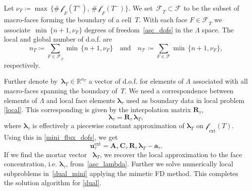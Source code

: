 \documentclass[12pt]{article}
\newcommand{\vect}[1]{\boldsymbol{\mathbf{#1}}}
\newcommand{\bcell}{T}
\newcommand{\bmesh}{{\vect{\mathcal T}}}
\newcommand{\mmesh}{{\vect{\mathcal \tau}}}
\newcommand{\bfaces}[1][]{{\vect{\mathcal F}_{\text{#1}}}}
\newcommand{\mfaces}[1][]{{\vect{\mathcal f}_{\text{#1}}}}
\newcommand{\Rn}[1]{{\mathbb R^{#1}}}
\begin{document}
	Let $\nu_F \coloneqq \max\,\{ \#\,\mfaces_F(T^+),\,\#\,\mfaces_F(T^-) \}$. We set~$\bfaces_\bcell \subset \bfaces$ to be the subset of macro-faces forming the boundary of a cell~$T$. With each face $F \in \bfaces_\bcell$ we associate~$\min\,\{ n+1, \nu_F \}$ degrees of freedom~\eqref{asc_dofs} in the $\Lambda$ space. The local and global number of d.o.f. are
	\[
		n_\bcell \coloneqq \sum_{F \in \bfaces_\bcell} \min\,\{ n+1, \nu_F \} \quad\text{and}\quad
		n_\bmesh \coloneqq \sum_{F \in \bfaces} \min\,\{ n+1, \nu_F \},
	\]
	respectively.
	
	Further denote by~${{\vect \lambda}_\bcell \in \Rn{n_\bcell}}$ a vector of d.o.f. for elements of $\Lambda$ associated with all macro-faces spanning the boundary of~$\bcell$. We need a correspondence between elements of $\Lambda$ and local face elements $\vect \lambda_\mmesh$ used as boundary data in local problem \eqref{local}.
	This corresponding is given by the interpolation matrix $ \vect R_\mmesh$,
	\begin{equation}\label{asc_lambda}
		{\vect \lambda}_\mmesh = \vect R_\mmesh\,{\vect \lambda}_\bcell,
	\end{equation}
	where ${\vect \lambda}_\mmesh$ is effectively a piecewise constant approximation of ${\vect \lambda}_\bcell$ on $\mfaces_{\text{ext}}(T)$.
	Using this in \eqref{mini_flux_dofs}, we get
	\begin{equation}\label{asc_flux_lambda}
		{\vect u}^\text{ext}_\mmesh = \vect A_\mmesh\,\vect C_\mmesh\,\vect R_\mmesh\,{\vect \lambda}_\bcell - {\vect a}_\mmesh.
	\end{equation}
	If we find the mortar vector ~${\vect \lambda}_\bcell$, we recover the local approximation to the face concentration, i.e. ${\vect \lambda}_\mmesh$, from~\eqref{asc_lambda}.
	Further we solve numerically local subproblems in~\eqref{dual_mini} applying the mimetic FD method. This completes the solution algorithm for \eqref{dual}.
	
\end{document}

